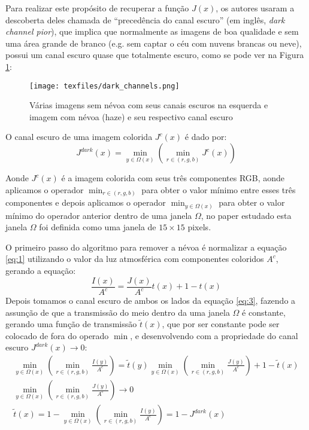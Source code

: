 \documentclass[12pt,openany, oneside,
 article, 
 a4paper, hyphens, english, brazil]{abntex2}
\begin{document}
Para realizar este propósito de recuperar a função $J(x)$, os autores usaram a descoberta deles chamada de ``precedência do canal escuro'' (em inglês, \textit{dark channel pior}), que implica que normalmente as imagens de boa qualidade e sem uma área grande de branco (e.g. sem captar o céu com nuvens brancas ou neve), possui um canal escuro quase que totalmente escuro, como se pode ver na Figura \ref{dark_channels}:

\begin{figure}[htb]
	\caption{\label{fig_circulo}Várias imagens sem névoa com seus canais escuros na esquerda e imagem com névoa (haze) e seu respectivo canal escuro}
	\begin{center}
		\texttt{[image: texfiles/dark\_channels.png]}
	\end{center}
	\label{dark_channels}
\end{figure}

O canal escuro de uma imagem colorida $J^c(x)$ é dado por:
\begin{equation}
J^{dark}(x) = \displaystyle \min_{y \in \Omega(x)} ( \min_{r \in (r,g,b)} J^c(x))
\end{equation}

Aonde $J^c(x)$ é a imagem colorida com seus três componentes RGB, aonde aplicamos o operador $\displaystyle \min_{r \in (r,g,b)}$ para obter o valor mínimo entre esses três componentes e depois aplicamos o operador $\displaystyle \min_{y \in \Omega(x)}$ para obter o valor mínimo do operador anterior dentro de uma janela $\Omega$, no paper estudado esta janela $\Omega$ foi definida como uma janela de $15\times15$ pixels.

O primeiro passo do algoritmo para remover a névoa é normalizar a equação \ref{eq:1} utilizando o valor da luz atmosférica com componentes coloridos $A^c$, gerando a equação:
\begin{equation}\label{eq:3}
\frac{I(x)}{A^c} = \frac{J(x)}{A^c}t(x) + 1 - t(x)
\end{equation}
Depois tomamos o canal escuro de ambos os lados da equação \ref{eq:3}, fazendo a assunção de que a transmissão do meio dentro da uma janela $\Omega$ é constante, gerando uma função de transmissão $\tilde{t}(x)$, que por ser constante pode ser colocado de fora do operado $\min$, e desenvolvendo com a propriedade do canal escuro $J^{dark}(x) \to 0$:
\begin{equation}\label{eq:4}
\begin{gathered}
\displaystyle \min_{y \in \Omega(x)} ( \min_{r \in (r,g,b)} \frac{I(y)}{A^c}) = 
\tilde{t}(y)\displaystyle \min_{y \in \Omega(x)} ( \min_{r \in (r,g,b)} \frac{J(y)}{A^c}) + 1 - \tilde{t}(x)
\\
\displaystyle \min_{y \in \Omega(x)} ( \min_{r \in (r,g,b)} \frac{J(y)}{A^c}) \to 0
\\
\tilde{t}(x) = 1 - \displaystyle \min_{y \in \Omega(x)} ( \min_{r \in (r,g,b)} \frac{I(y)}{A^c}) = 1 - J^{dark}(x)
\end{gathered}
\end{equation}
\end{document}
